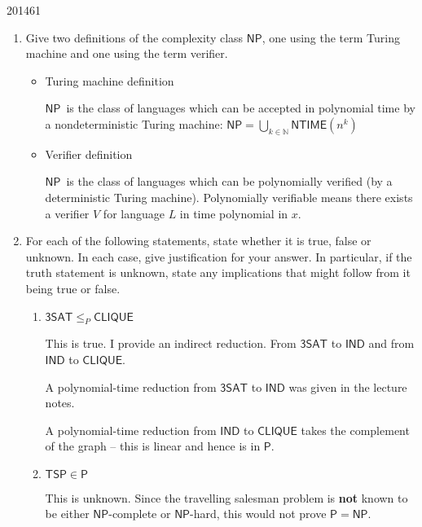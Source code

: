 \documentclass[10pt,\jkfside,a4paper]{article}
\newcommand{\NP}{\ensuremath{\mathsf{NP}}}
\begin{document}
\begin{examquestion}{2014}{6}{1}

\begin{enumerate}[label=(\alph*)]

\item Give two definitions of the complexity class \NP, one using
the term Turing machine and one using the term verifier.

\begin{itemize}

\item Turing machine definition

\NP\ is the class of languages which can be accepted in polynomial
time by a nondeterministic Turing machine:
$\NP = \bigcup_{k \in \mathbb N} \mathsf{NTIME}(n^k)$

\item Verifier definition

\NP\ is the class of languages which can be polynomially verified (by a
deterministic Turing machine). Polynomially verifiable means there exists a
verifier $V$ for language $L$ in time polynomial in $x$.

\end{itemize}

\item For each of the following statements, state whether it is true, false
or unknown. In each case, give justification for your answer. In particular,
if the truth statement is unknown, state any implications that might follow
from it being true or false.

\begin{enumerate}[label=(\roman*)]

\item $\mathsf{3SAT} \le_P \mathsf{CLIQUE}$

This is true. I provide an indirect reduction. From $\mathsf{3SAT}$ to
$\mathsf{IND}$ and from $\mathsf{IND}$ to $\mathsf{CLIQUE}$.

A polynomial-time reduction from $\mathsf{3SAT}$ to $\mathsf{IND}$ was given in
the lecture notes.

A polynomial-time reduction from $\mathsf{IND}$ to $\mathsf{CLIQUE}$ takes
the complement of the graph -- this is linear and hence is in $\mathsf{P}$.

\item $\mathsf{TSP} \in \mathsf{P}$

This is unknown. Since the travelling salesman problem is \textbf{not} known
to be either \NP-complete or \NP-hard, this would not prove $\mathsf{P} =
\NP$.


\end{enumerate}
\end{enumerate}
\end{examquestion}
\end{document}
